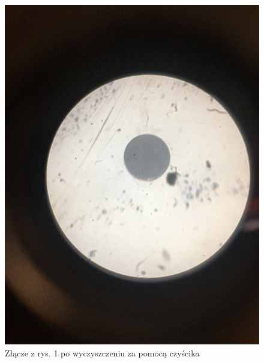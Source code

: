 \documentclass[12pt, a4paper, oneside]{article}
\begin{document}
\begin{figure}[b]
\centering
\caption{Złącze z rys. 1 po wyczyszczeniu za pomocą czyścika}
\includegraphics[scale=0.1]{m2.jpg}
\end{figure}
\clearpage
\end{document}

